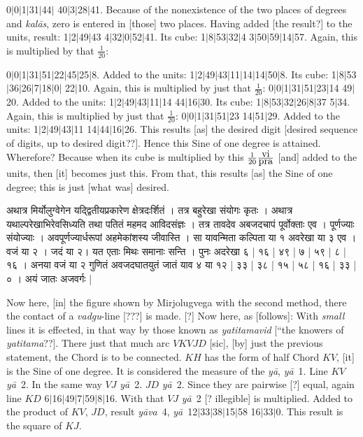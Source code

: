 \documentclass[11pt,a5paper]{book}
\def\kalas{\textit{ka\-l\=as}}
\def\ya{\textit{y\=a}}
\def\yava{\textit{y\=ava}}
\def\danda{$|$}
\begin{document}
{0\danda 0\danda 1\danda 31\danda 44\danda
40\danda 3\danda 28\danda 41.
Because of the nonexistence of the two places of degrees and \kalas, zero is entered in 
[those] two places. Having added [the result?] to the units, result:
1\danda 2\danda 49\danda 43 4\danda 32\danda 0\danda 52\danda 41. Its cube:
1\danda 8\danda 53\danda 32\danda 4 3\danda 50\danda 59\danda 14\danda 57.
Again, this  is multiplied by that $\frac{1}{20}$: 


0\danda 0\danda 1\danda 31\danda 51\danda 22\danda 45\danda 25\danda 8.
Added to the units:
1\danda 2\danda 49\danda 43\danda 11\danda 14\danda 14\danda 50\danda 8.
Its cube: 1\danda 8\danda 53\danda 36\danda 26\danda 7\danda 18\danda 0\danda
22\danda 10.
Again, this is multiplied by just that $\frac{1}{20}$: 
0\danda 0\danda 1\danda 31\danda 51\danda 23\danda 14 49\danda 20.
Added to the units: 1\danda 2\danda 49\danda 43\danda 11\danda 14 44\danda 16\danda 30.
Its cube: 1\danda 8\danda 53\danda 32\danda 26\danda 8\danda 37 5\danda 34.
Again, this is multiplied by just that $\frac{1}{20}$: 
0\danda 0\danda 1\danda 31\danda 51\danda 23 14\danda 51\danda 29. 
Added to the units: 1\danda 2\danda 49\danda 43\danda 11 14\danda 44\danda 16\danda 26.
This results [as] the desired digit [desired sequence of digits, up to desired digit??]. 
Hence this Sine of one degree is attained.  Wherefore?  Because when its cube 
is multiplied by this $\frac{1}{20} \frac{\hbox{vi}}{\hbox{pra}}$ [and] added to the units,
then [it] becomes just this. From that, this results [as] the Sine of one degree; this is just
[what was] desired. 



\newpage
{\s अथात्र मिर्योलुग्वेगेन
यद्द्वितीयप्रकारेण क्षेत्रदःर्शितं । तत्र बहुरेखा संयोगः कृतः । 
अथात्र यथाल्परेखाभिरेवसिध्यति तथा पतितं महमद आविदसंज्ञः । 
तत्र तावदेव अबजदचापं पूर्वोक्ताः एव । पूर्णज्याः
संयोज्याः । अवपूर्णज्यार्धरूपां अहमेकांशस्य जीवास्ति । 
सा यावन्मिता कल्पिता या १ अवरेखा या ३ एव । वजं  या २ । जदं या २। यत एताः मिथः
समानाः सन्ति । पुनः अदरेखा ६ | १६ | ४९ | ७ | ५९ | ८ | १६ । अनया वजं या २
गुणितं अवजदघातयुतं जातं याव ४ या १२ | ३३ | ३८ | १५ | ५८ | १६ | ३३ | ० । अयं
जातः अजवर्गः |}
\newpage

Now here, [in] the figure shown by Mirjolugvega with the second method, there 
the contact of a \textit{vadgu}-line [???] is made. [?]  Now here, as [follows]:  
With \emph{small} lines 
it is effected, in that way by those known as \textit{yatitamavid} [``the knowers of
\textit{yatitama}??].  There just that much arc $VKVJD$ [sic], [by] just the previous
statement, the Chord is to be connected. $KH$ has the form of half Chord $KV$, 
[it] is the Sine of one degree. It is considered the measure of the \ya, \ya\ 1.
Line $KV$ \ya\ 2. In the same way $VJ$ \ya\ 2. $JD$ \ya\ 2. Since they are 
pairwise [?] equal, again line $KD$
6\danda 16\danda 49\danda 7\danda 59\danda 8\danda 16. 
With that $VJ$ \ya\ 2 [? illegible] is multiplied. Added to the product of
$KV$, $JD$, result \yava\ 4, \ya\ 12\danda 33\danda 38\danda 15\danda 58
16\danda 33\danda 0. This result is the square of $KJ$. \\

}
\end{document}
